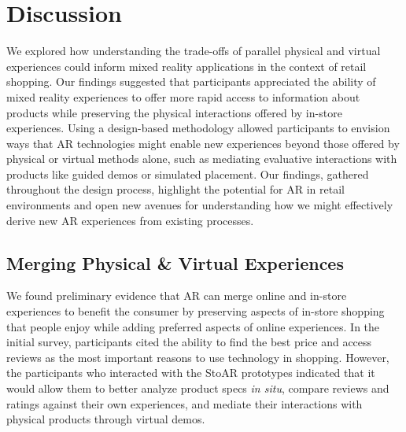 \section{Discussion}
We explored how understanding the trade-offs of parallel physical and virtual experiences could inform mixed reality applications in the context of retail shopping. Our findings suggested that participants appreciated the ability of mixed reality experiences to offer more rapid access to information about products while preserving the physical interactions offered by in-store experiences. Using a design-based methodology allowed participants to envision ways that AR technologies might enable new experiences beyond those offered by physical or virtual methods alone, such as mediating evaluative interactions with products like guided demos or simulated placement.  
Our findings, gathered throughout the design process, highlight the potential for AR in retail environments and open new avenues for understanding how we might effectively derive new AR experiences from existing processes. 

\subsection{Merging Physical \& Virtual Experiences}
We found preliminary evidence that AR can merge online and in-store experiences to benefit the consumer by preserving aspects of in-store shopping that people enjoy while adding preferred aspects of online experiences.  In the initial survey, participants cited the ability to find the best price and access reviews as the most important reasons to use technology in shopping. However, the participants who interacted with the StoAR prototypes indicated that it would allow them to better analyze product specs \emph{in situ}, compare reviews and ratings against their own experiences, and mediate their interactions with physical products through virtual demos.

